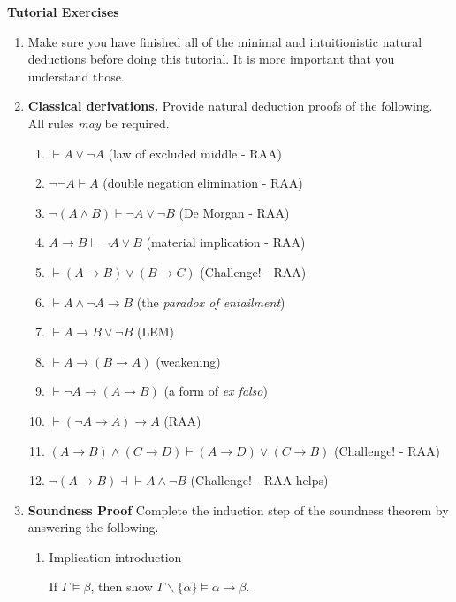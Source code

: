 \documentclass[11pt]{report}
\begin{document}
\newpage
{\bf Tutorial Exercises}
\begin{enumerate}

	\item Make sure you have finished all of the minimal and intuitionistic natural deductions before doing this tutorial. It is more important that you understand those.
	
	\item \textbf{Classical derivations.} Provide natural deduction proofs of the following. All rules \emph{may} be required.
	
	\begin{enumerate}
		\item $\vdash   A \lor \neg A$ \hfill (law of excluded middle - RAA)
		\item $\neg\neg A \vdash   A$ \hfill (double negation elimination - RAA)
		\item $\neg( A \land  B) \vdash  \neg  A \lor \neg  B$ \hfill (De Morgan - RAA)
		\item $ A \to  B \vdash  \neg  A \lor  B$ \hfill (material implication - RAA)

		\item $\vdash  ( A \to  B) \lor ( B \to  C)$ \hfill (Challenge! - RAA)
		\item \(\vdash   A\land \neg  A \to  B\) \hfill (the \emph{paradox of entailment})
		\item \(\vdash   A\to B\lor\neg B\) \hfill (LEM)
		\item \(\vdash   A\to( B\to A)\) \hfill (weakening)
		\item \(\vdash  \neg A\to( A \to B)\) \hfill (a form of \emph{ex falso})
		\item $\vdash (\neg A\to A)\to A$ \hfill (RAA)
		\item $( A \to  B) \land ( C \to  D) \vdash ( A \rightarrow  D) \lor ( C \rightarrow  B)$ \hfill (Challenge! - RAA) 
		\item $\lnot ( A \to  B) \dashv\vdash  A \land \lnot B$ \hfill (Challenge! - RAA helps)
	\end{enumerate}

\item {\bf Soundness Proof}	Complete the induction step of the soundness theorem by answering the following. 

		\begin{enumerate}
			\item Implication introduction
			
			If $\Gamma \models \beta$, then show $\Gamma \backslash\{\alpha\} \models \alpha \rightarrow \beta$.
			

\end{enumerate}
\end{enumerate}
\end{document}
